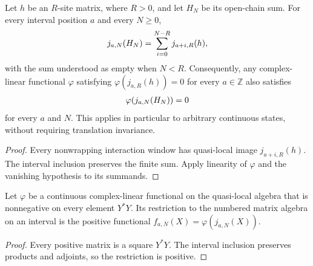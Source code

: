 \begin{lemma}
    \label{thm:quasi_local_open_interaction_zero_expectation}
    \leanok
    Let $h$ be an $R$-site matrix, where $R>0$, and let $H_N$ be its open-chain
    sum. For every interval position $a$ and every $N\geq0$,
    \begin{align}
        j_{a,N}(H_N)=\sum_{i=0}^{N-R}j_{a+i,R}(h),
        \notag
    \end{align}
    with the sum understood as empty when $N<R$.
    Consequently, any complex-linear functional $\varphi$ satisfying
    $\varphi(j_{a,R}(h))=0$ for every $a\in\mathbb Z$ also satisfies
    \begin{align}
        \varphi(j_{a,N}(H_N))=0
        \notag
    \end{align}
    for every $a$ and $N$. This applies in particular to arbitrary continuous
    states, without requiring translation invariance.
\end{lemma}
\begin{proof}\leanok
    Every nonwrapping interaction window has quasi-local image $j_{a+i,R}(h)$.
    The interval inclusion preserves the finite sum. Apply linearity of
    $\varphi$ and the vanishing hypothesis to its summands.
\end{proof}

\begin{definition}
    \label{def:positive_interval_state_restriction}
    \leanok
    Let $\varphi$ be a continuous complex-linear functional on the quasi-local
    algebra that is nonnegative on every element $Y^*Y$. Its restriction to
    the numbered matrix algebra on an interval is the positive functional
    $f_{a,N}(X)=\varphi(j_{a,N}(X))$.
\end{definition}
\begin{proof}\leanok
    Every positive matrix is a square $Y^*Y$. The interval inclusion preserves
    products and adjoints, so the restriction is positive.
\end{proof}

